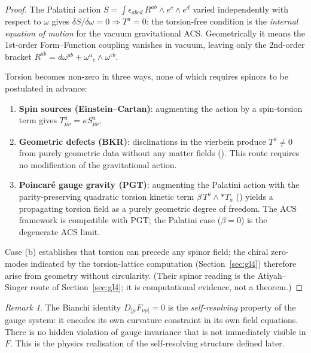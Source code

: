 \documentclass[11pt,a4paper]{article}
\theoremstyle{plain}
\theoremstyle{definition}
\theoremstyle{remark}
\newtheorem{remark}[theorem]{Remark}
\begin{document}
\begin{proof}
The Palatini action $S = \int \epsilon_{abcd}\, R^{ab} \wedge e^c \wedge e^d$
varied independently with respect to $\omega$ gives $\delta S/\delta\omega = 0
\Rightarrow T^a = 0$: the torsion-free condition is the \emph{internal equation
of motion} for the vacuum gravitational ACS.  Geometrically it means the
1st-order Form--Function coupling vanishes in vacuum, leaving only the
2nd-order bracket $R^{ab} = d\omega^{ab} + \omega^a{}_c\wedge\omega^{cb}$.

Torsion becomes non-zero in three ways, none of which requires spinors
to be postulated in advance:
\begin{enumerate}[noitemsep,label=(\alph*)]
  \item \textbf{Spin sources (Einstein--Cartan)}: augmenting the action by
    a spin-torsion term gives $T^a_{\mu\nu} = \kappa S^a_{\mu\nu}$.
  \item \textbf{Geometric defects (BKR)}: disclinations in the vierbein produce
    $T^a \neq 0$ from purely geometric data without any matter fields
    (\cite{BKR1955}).  This route requires no
    modification of the gravitational action.
  \item \textbf{Poincar\'{e} gauge gravity (PGT)}: augmenting the Palatini action
    with the parity-preserving quadratic torsion kinetic term
    $\beta\,T^a\wedge{*T_a}$ (\cite{Kibble1961,Sciama1964,Hehl1976})
    yields a propagating torsion field as a purely geometric degree of freedom.
    The ACS framework is compatible with PGT; the Palatini case ($\beta=0$)
    is the degenerate ACS limit.
\end{enumerate}
Case (b) establishes that torsion can precede any spinor field; the
chiral zero-modes indicated by the torsion-lattice computation
(Section~\ref{sec:gl4}) therefore arise from geometry without
circularity.  (Their spinor reading is the Atiyah--Singer route of
Section~\ref{sec:gl4}; it is computational evidence, not a theorem.)
\end{proof}

\begin{remark}
The Bianchi identity $D_{[\mu}F_{\nu\rho]} = 0$ is the \emph{self-resolving}
property of the gauge system: it encodes its own curvature constraint
in its own field equations.  
There is no hidden violation of gauge invariance that is not 
immediately visible in $F$.  This is the physics realisation of the 
self-resolving structure defined later.
\end{remark}
\end{document}
